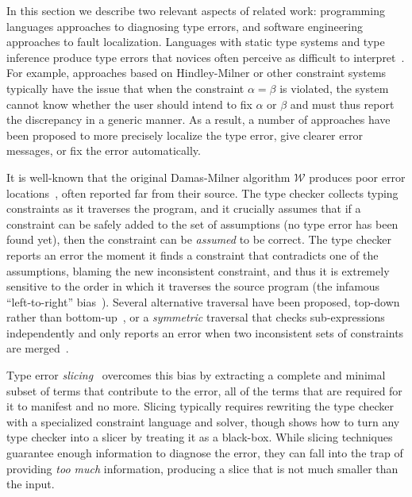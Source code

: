 \label{sec:related-work}
\label{sec:type-error-diagnosis}

In this section we describe two relevant aspects of related work:
%
programming languages approaches to diagnosing type errors, and
%
software engineering approaches to fault localization.
%
%
Languages with static type systems and type inference produce type
errors that novices often perceive as difficult to
interpret~\citep{Wand1986-nw}.
%
For example, approaches based on Hindley-Milner or other constraint
systems typically have the issue that when the constraint $\alpha=\beta$
is violated, the system cannot know whether the user should intend to
fix $\alpha$ or $\beta$ and must thus report the discrepancy in a
generic manner.
%
As a result, a number of approaches have been proposed to
more precisely localize the type error,
give clearer error messages, or
fix the error automatically.
%

It is well-known that the original Damas-Milner algorithm $\mathcal{W}$
produces poor error locations~\citep{Wand1986-nw}, often reported far
from their source.
%
The type checker collects typing constraints as it traverses the
program, and it crucially assumes that if a constraint can be safely
added to the set of assumptions (\ie no type error has been found yet),
then the constraint can be \emph{assumed} to be correct.
%
The type checker reports an error the moment it finds a constraint that
contradicts one of the assumptions, blaming the new inconsistent
constraint, and thus it is extremely sensitive to the order in which it
traverses the source program (the infamous ``left-to-right''
bias~\citep{McAdam1998-ub}).
%
Several alternative traversal have been proposed, \eg
top-down rather than bottom-up~\citep{Lee1998-ys}, or a \emph{symmetric}
traversal that checks sub-expressions independently and only reports an
error when two inconsistent sets of constraints are
merged~\citep{McAdam1998-ub,Yang1999-yr}.

Type error \emph{slicing}~\citep{Haack2003-vc,Tip2001-qp,Rahli2010-ps}
overcomes this bias by extracting a complete and minimal subset
of terms that contribute to the error, \ie all of the
terms that are required for it to manifest and no more.
%
Slicing typically requires rewriting the type checker with a
specialized constraint language and solver, though
\citet{Schilling2011-yf} shows how to turn any type checker into a
slicer by treating it as a black-box.
%
While slicing techniques guarantee enough information to diagnose the
error, they can fall into the trap of providing \emph{too much}
information, producing a slice that is not much smaller than
the input. %

